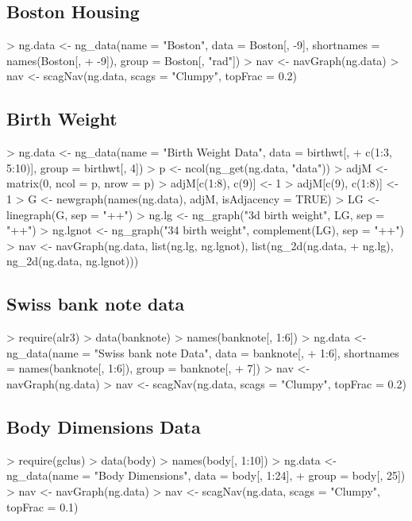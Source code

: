 \documentclass[12pt,oneside,titlepage,letter]{article}
\begin{document}
\subsection{Boston Housing}
\begin{Schunk}
\begin{Sinput}
> ng.data <- ng_data(name = "Boston", data = Boston[, -9], shortnames = names(Boston[, 
+     -9]), group = Boston[, "rad"])
> nav <- navGraph(ng.data)
> nav <- scagNav(ng.data, scags = "Clumpy", topFrac = 0.2)
\end{Sinput}
\end{Schunk}

\subsection{Birth Weight}
\begin{Schunk}
\begin{Sinput}
> ng.data <- ng_data(name = "Birth Weight Data", data = birthwt[, 
+     c(1:3, 5:10)], group = birthwt[, 4])
> p <- ncol(ng_get(ng.data, "data"))
> adjM <- matrix(0, ncol = p, nrow = p)
> adjM[c(1:8), c(9)] <- 1
> adjM[c(9), c(1:8)] <- 1
> G <- newgraph(names(ng.data), adjM, isAdjacency = TRUE)
> LG <- linegraph(G, sep = "++")
> ng.lg <- ng_graph("3d birth weight", LG, sep = "++")
> ng.lgnot <- ng_graph("34 birth weight", complement(LG), sep = "++")
> nav <- navGraph(ng.data, list(ng.lg, ng.lgnot), list(ng_2d(ng.data, 
+     ng.lg), ng_2d(ng.data, ng.lgnot)))
\end{Sinput}
\end{Schunk}

\subsection{Swiss bank note data}
\begin{Schunk}
\begin{Sinput}
> require(alr3)
> data(banknote)
> names(banknote[, 1:6])
> ng.data <- ng_data(name = "Swiss bank note Data", data = banknote[, 
+     1:6], shortnames = names(banknote[, 1:6]), group = banknote[, 
+     7])
> nav <- navGraph(ng.data)
> nav <- scagNav(ng.data, scags = "Clumpy", topFrac = 0.2)
\end{Sinput}
\end{Schunk}

\subsection{Body Dimensions Data}
\begin{Schunk}
\begin{Sinput}
> require(gclus)
> data(body)
> names(body[, 1:10])
> ng.data <- ng_data(name = "Body Dimensions", data = body[, 1:24], 
+     group = body[, 25])
> nav <- navGraph(ng.data)
> nav <- scagNav(ng.data, scags = "Clumpy", topFrac = 0.1)
\end{Sinput}
\end{Schunk}
\end{document}
